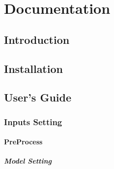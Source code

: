 \documentclass[letterpaper,10pt,english]{sphinxmanual}
\begin{document}
\section{Documentation}
\label{\detokenize{documentation:documentation}}\label{\detokenize{documentation::doc}}
\sphinxstepscope


\subsection{Introduction}
\label{\detokenize{introduction:introduction}}\label{\detokenize{introduction::doc}}
\sphinxstepscope


\subsection{Installation}
\label{\detokenize{installation:installation}}\label{\detokenize{installation::doc}}
\sphinxstepscope


\subsection{User’s Guide}
\label{\detokenize{user_guide:user-s-guide}}\label{\detokenize{user_guide::doc}}
\sphinxstepscope


\subsubsection{Inputs Setting}
\label{\detokenize{inputs:inputs-setting}}\label{\detokenize{inputs::doc}}

\paragraph{Pre\sphinxhyphen{}Process}
\label{\detokenize{inputs:pre-process}}
\sphinxAtStartPar
{}


\subparagraph{Model Setting}
\label{\detokenize{inputs:model-setting}}
\sphinxAtStartPar
{}
\end{document}
